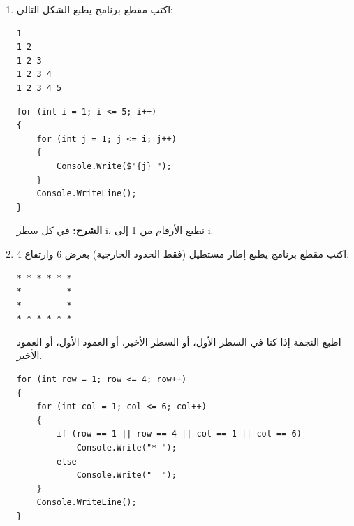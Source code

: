 \documentclass[14pt]{extarticle}
\begin{document}
\begin{enumerate}[itemsep=2em]
    \item
    اكتب مقطع برنامج يطبع الشكل التالي:
    \begin{english}
    \begin{boxCode}
\begin{verbatim}
1
1 2
1 2 3
1 2 3 4
1 2 3 4 5
    \end{verbatim}
\end{boxCode}
    \end{english}
    \ifwithsols
    \begin{boxSolution}
    \begin{english}
    \begin{verbatim}
for (int i = 1; i <= 5; i++)
{
    for (int j = 1; j <= i; j++)
    {
        Console.Write($"{j} ");
    }
    Console.WriteLine();
}
    \end{verbatim}
    \end{english}
    \textbf{الشرح:} في كل سطر \textenglish{i}، نطبع الأرقام من 1 إلى \textenglish{i}.
    \end{boxSolution}
    \fi

    \clearpage
    \item
    اكتب مقطع برنامج يطبع إطار مستطيل (فقط الحدود الخارجية) بعرض 6 وارتفاع 4:
    \begin{english}
    \begin{boxCode}
\begin{verbatim}
* * * * * *
*         *
*         *
* * * * * *
    \end{verbatim}
\end{boxCode}
    \end{english}
    \begin{boxHint}
         اطبع النجمة إذا كنا في السطر الأول، أو السطر الأخير، أو العمود الأول، أو العمود الأخير.
    \end{boxHint}
    \ifwithsols
    \begin{boxSolution}
    \begin{english}
    \begin{verbatim}
for (int row = 1; row <= 4; row++)
{
    for (int col = 1; col <= 6; col++)
    {
        if (row == 1 || row == 4 || col == 1 || col == 6)
            Console.Write("* ");
        else
            Console.Write("  ");
    }
    Console.WriteLine();
}
    \end{verbatim}
    \end{english}
    \end{boxSolution}
    \clearpage
    \fi


\end{enumerate}
\end{document}
